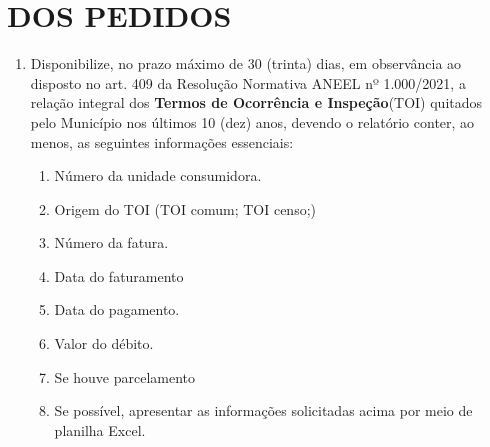  


\newcommand{\Peticao}{PETIÇÃO DE DOCUMENTOS E INFORMAÇÕES}
\newcommand{\NumeroDoc}{003}



\renewcommand{\ExibirUnidadeConsumidora}{0}
 




\section{DOS PEDIDOS}

\begin{enumerate}[resume]
  \item Disponibilize, no prazo máximo de 30 (trinta) dias, em observância ao disposto no art. 409 da Resolução Normativa ANEEL nº 1.000/2021, a relação integral dos \textbf{Termos de Ocorrência e Inspeção}(TOI) quitados pelo Município nos últimos 10 (dez) anos, devendo o relatório conter, ao menos, as seguintes informações essenciais: 
  \begin{enumerate}
    \item Número da unidade consumidora.
    \item Origem do TOI (TOI comum; TOI censo;)
    \item Número da fatura.
    \item Data do faturamento
    \item Data do pagamento.
    \item Valor do débito.
    \item Se houve parcelamento
    \item Se possível, apresentar as informações solicitadas acima por meio de planilha Excel.
  \end{enumerate}
\end{enumerate}






